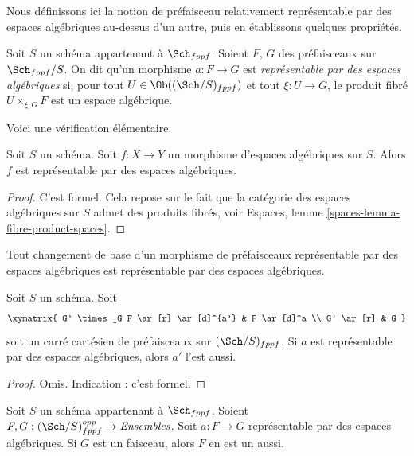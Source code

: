\noindent
Nous définissons ici la notion de préfaisceau relativement représentable
par des espaces algébriques au-dessus d'un autre, puis en établissons quelques propriétés.

\begin{definition}
\label{definition-morphism-representable-by-spaces}
Soit $S$ un schéma appartenant à $\Sch_{fppf}$.
Soient $F$, $G$ des préfaisceaux sur $\Sch_{fppf}/S$.
On dit qu'un morphisme $a : F \to G$ est
{\it représentable par des espaces algébriques}
si, pour tout $U \in \Ob((\Sch/S)_{fppf})$ et
tout $\xi : U \to G$, le produit fibré $U \times_{\xi, G} F$
est un espace algébrique.
\end{definition}

\noindent
Voici une vérification élémentaire.

\begin{lemma}
\label{lemma-morphism-spaces-is-representable-by-spaces}
Soit $S$ un schéma.
Soit $f : X \to Y$ un morphisme d'espaces algébriques sur $S$.
Alors $f$ est représentable par des espaces algébriques.
\end{lemma}

\begin{proof}
C'est formel. Cela repose sur le fait que
la catégorie des espaces algébriques sur $S$ admet des produits fibrés, voir
Espaces, lemme \ref{spaces-lemma-fibre-product-spaces}.
\end{proof}

\begin{lemma}
\label{lemma-base-change-transformation}
\begin{slogan}
Tout changement de base d'un morphisme de préfaisceaux représentable
par des espaces algébriques est représentable par des espaces algébriques.
\end{slogan}
Soit $S$ un schéma. Soit
$$
\xymatrix{
G' \times_G F \ar[r] \ar[d]^{a'} & F \ar[d]^a \\
G' \ar[r] & G
}
$$
soit un carré cartésien de préfaisceaux sur $(\Sch/S)_{fppf}$.
Si $a$ est représentable par des espaces algébriques, alors $a'$ l'est aussi.
\end{lemma}

\begin{proof}
Omis. Indication : c'est formel.
\end{proof}

\begin{lemma}
\label{lemma-representable-by-spaces-transformation-to-sheaf}
Soit $S$ un schéma appartenant à $\Sch_{fppf}$.
Soient $F, G : (\Sch/S)_{fppf}^{opp} \to \textit{Ensembles}$.
Soit $a : F \to G$ représentable par des espaces algébriques.
Si $G$ est un faisceau, alors $F$ en est un aussi.
\end{lemma}

